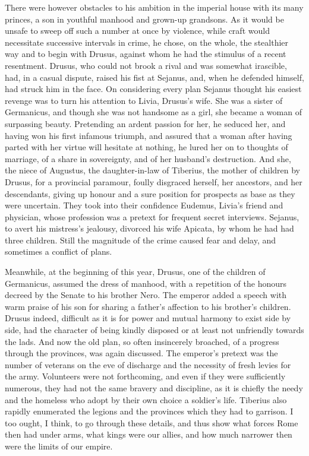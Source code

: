 
There were however obstacles to his ambition in the imperial house with its many princes, a son in youthful manhood and grown-up grandsons. As it would be unsafe to sweep off such a number at once by violence, while craft would necessitate successive intervals in crime, he chose, on the whole, the stealthier way and to begin with Drusus, against whom he had the stimulus of a recent resentment. Drusus, who could not brook a rival and was somewhat irascible, had, in a casual dispute, raised his fist at Sejanus, and, when he defended himself, had struck him in the face. On considering every plan Sejanus thought his easiest revenge was to turn his attention to Livia, Drusus's wife. She was a sister of Germanicus, and though she was not handsome as a girl, she became a woman of surpassing beauty. Pretending an ardent passion for her, he seduced her, and having won his first infamous triumph, and assured that a woman after having parted with her virtue will hesitate at nothing, he lured her on to thoughts of marriage, of a share in sovereignty, and of her husband's destruction. And she, the niece of Augustus, the daughter-in-law of Tiberius, the mother of children by Drusus, for a provincial paramour, foully disgraced herself, her ancestors, and her descendants, giving up honour and a sure position for prospects as base as they were uncertain. They took into their confidence Eudemus, Livia's friend and physician, whose profession was a pretext for frequent secret interviews. Sejanus, to avert his mistress's jealousy, divorced his wife Apicata, by whom he had had three children. Still the magnitude of the crime caused fear and delay, and sometimes a conflict of plans.


Meanwhile, at the beginning of this year, Drusus, one of the children of Germanicus, assumed the dress of manhood, with a repetition of the honours decreed by the Senate to his brother Nero. The emperor added a speech with warm praise of his son for sharing a father's affection to his brother's children. Drusus indeed, difficult as it is for power and mutual harmony to exist side by side, had the character of being kindly disposed or at least not unfriendly towards the lads. And now the old plan, so often insincerely broached, of a progress through the provinces, was again discussed. The emperor's pretext was the number of veterans on the eve of discharge and the necessity of fresh levies for the army. Volunteers were not forthcoming, and even if they were sufficiently numerous, they had not the same bravery and discipline, as it is chiefly the needy and the homeless who adopt by their own choice a soldier's life. Tiberius also rapidly enumerated the legions and the provinces which they had to garrison. I too ought, I think, to go through these details, and thus show what forces Rome then had under arms, what kings were our allies, and how much narrower then were the limits of our empire.

